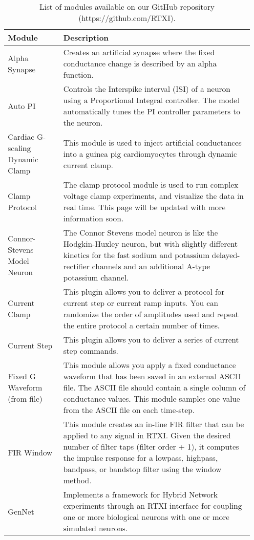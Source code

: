 \renewcommand*{\arraystretch}{1.1}
\begin{longtable}{| p{} | p{} |} 
\caption{List of modules available on our GitHub repository (https://github.com/RTXI).} \\
 \hline
 \textbf{Module} & \textbf{Description}\\\hline
 Alpha Synapse & Creates an artificial synapse where the fixed conductance change is described by an alpha function.  \\\hline
 Auto PI & Controls the Interspike interval (ISI) of a neuron using a Proportional Integral controller. The model automatically tunes the PI controller parameters to the neuron. \\\hline
 Cardiac G-scaling Dynamic Clamp & This module is used to inject artificial conductances into a guinea pig cardiomyocytes through dynamic current clamp.  \\\hline
 Clamp Protocol & The clamp protocol module is used to run complex voltage clamp experiments, and visualize the data in real time. This page will be updated with more information soon. \\\hline
 Connor-Stevens Model Neuron & The Connor Stevens model neuron is like the Hodgkin-Huxley neuron, but with slightly different kinetics for the fast sodium and potassium delayed-rectifier channels and an additional A-type potassium channel. \\\hline
 Current Clamp & This plugin allows you to deliver a protocol for current step or current ramp inputs. You can randomize the order of amplitudes used and repeat the entire protocol a certain number of times. \\\hline
 Current Step & This plugin allows you to deliver a series of current step commands. \\\hline
 Fixed G Waveform (from file) & This module allows you apply a fixed conductance waveform that has been saved in an external ASCII file. The ASCII file should contain a single column of conductance values. This module samples one value from the ASCII file on each time-step. \\\hline
 FIR Window & This module creates an in-line FIR filter that can be applied to any signal in RTXI. Given the desired number of filter taps (filter order + 1), it computes the impulse response for a lowpass, highpass, bandpass, or bandstop filter using the window method. \\\hline
 GenNet & Implements a framework for Hybrid Network experiments through an RTXI interface for coupling one or more biological neurons with one or more simulated neurons.  \\\hline

\end{longtable}
